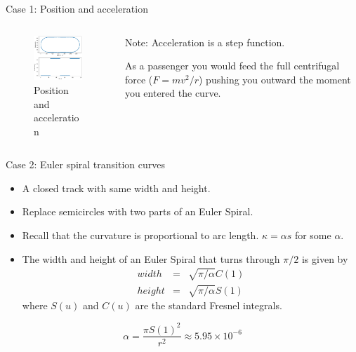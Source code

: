\documentclass{beamer}
\begin{document}
\begin{frame}{Case 1: Position and acceleration}
	\begin{columns}
		\begin{column}{0.8\textwidth}			
			\begin{figure}
				\caption{Position and acceleration}
				\centering
				\includegraphics[width=70mm, scale=0.2]{circular_track.png}
			\end{figure}
		\end{column}
		\begin{column}{0.33\textwidth}
			Note: Acceleration is a step function. 
			
			
			As a passenger you would feed the full centrifugal force ({\alert{$F=mv^2/r$}}) pushing you outward the moment you entered the curve. 		
		\end{column}
	\end{columns}
\end{frame}


\begin{frame}{Case 2: Euler spiral transition curves}
	\begin{itemize}
		\item A closed track with same width and height. 
		\item Replace semicircles with two parts of an Euler Spiral.
		\item Recall that the curvature is proportional to arc length. $\kappa = \alpha s $ for some $\alpha$.
		\item The width and height of an Euler Spiral that turns through $\pi/2$ is given by 
		\begin{eqnarray*}
			width &=& \sqrt{\pi / \alpha} C(1) \\
			height &=& \sqrt{\pi /\alpha}S(1)
		\end{eqnarray*}
		where $S(u)$ and $C(u)$ are the standard Fresnel integrals.
	
	\end{itemize}
	
	\[
	\alpha = \frac{\pi S(1)^2}{r^2} \approx 5.95 \times 10 ^{-6}
	\]
	
\end{frame}
\end{document}
